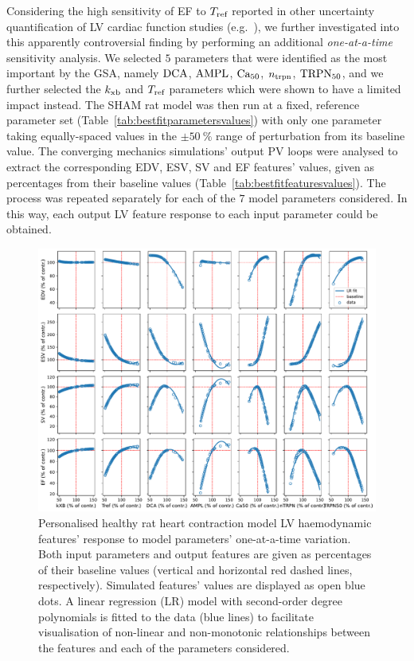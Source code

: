 \vspace{0.2cm}
Considering the high sensitivity of EF to $T_{\textrm{ref}}$ reported in other uncertainty quantification of LV cardiac function studies (e.g.~\cite{Campos:2020}), we further investigated into this apparently controversial finding by performing an additional \textit{one-at-a-time} sensitivity analysis. We selected $5$ parameters that were identified as the most important by the GSA, namely $\textrm{DCA}$, $\textrm{AMPL}$, $\textrm{Ca}_{50}$, $n_{\textrm{trpn}}$, $\textrm{TRPN}_{50}$, and we further selected the $k_{\textrm{xb}}$ and $T_{\textrm{ref}}$ parameters which were shown to have a limited impact instead. The SHAM rat model was then run at a fixed, reference parameter set (Table~\ref{tab:bestfitparametersvalues}) with only one parameter taking equally-spaced values in the $\pm\SI{50}{\percent}$ range of perturbation from its baseline value. The converging mechanics simulations' output PV loops were analysed to extract the corresponding EDV, ESV, SV and EF features' values, given as percentages from their baseline values (Table~\ref{tab:bestfitfeaturesvalues}). The process was repeated separately for each of the $7$ model parameters considered. In this way, each output LV feature response to each input parameter could be obtained.

\begin{figure}[ht!]
    \myfloatalign
    \includegraphics[width=\textwidth]{figures/chapter07/Figure_oneatatime_thesis.pdf}
    \caption{Personalised healthy rat heart contraction model LV haemodynamic features' response to model parameters' one-at-a-time variation. Both input parameters and output features are given as percentages of their baseline values (vertical and horizontal red dashed lines, respectively). Simulated features' values are displayed as open blue dots. A linear regression (LR) model with second-order degree polynomials is fitted to the data (blue lines) to facilitate visualisation of non-linear and non-monotonic relationships between the features and each of the parameters considered.}
    \label{fig:oat}
\end{figure}

